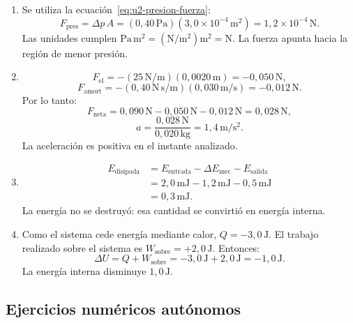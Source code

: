 \begin{enumerate}[label=\textbf{NG\arabic*.},leftmargin=*]
    \item Se utiliza la ecuación~\eqref{eq:u2-presion-fuerza}:
    \[
        F_\mathrm{pres}
        =\Delta p\,A
        =(0{,}40\,\text{Pa})(3{,}0\times10^{-4}\,\text{m}^{2})
        =1{,}2\times10^{-4}\,\text{N}.
    \]
    Las unidades cumplen
    \(\text{Pa}\,\text{m}^{2}
    =(\text{N}/\text{m}^{2})\text{m}^{2}
    =\text{N}\). La fuerza apunta hacia la región de menor presión.

    \item
    \[
        F_\mathrm{el}
        =-(25\,\text{N}/\text{m})(0{,}0020\,\text{m})
        =-0{,}050\,\text{N},
    \]
    \[
        F_\mathrm{amort}
        =-(0{,}40\,\text{N}\,\text{s}/\text{m})
        (0{,}030\,\text{m}/\text{s})
        =-0{,}012\,\text{N}.
    \]
    Por lo tanto:
    \[
        F_\mathrm{neta}
        =0{,}090\,\text{N}-0{,}050\,\text{N}-0{,}012\,\text{N}
        =0{,}028\,\text{N},
    \]
    \[
        a=\frac{0{,}028\,\text{N}}{0{,}020\,\text{kg}}
        =1{,}4\,\text{m}/\text{s}^{2}.
    \]
    La aceleración es positiva en el instante analizado.

    \item
    \[
        \begin{aligned}
            E_\mathrm{disipada}
            &=E_\mathrm{entrada}-\Delta E_\mathrm{mec}-E_\mathrm{salida}\\
            &=2{,}0\,\text{mJ}-1{,}2\,\text{mJ}-0{,}5\,\text{mJ}\\
            &=0{,}3\,\text{mJ}.
        \end{aligned}
    \]
    La energía no se destruyó: esa cantidad se convirtió en energía interna.

    \item Como el sistema cede energía mediante calor,
    \(Q=-3{,}0\,\text{J}\). El trabajo realizado sobre el sistema es
    \(W_\mathrm{sobre}=+2{,}0\,\text{J}\). Entonces:
    \[
        \Delta U
        =Q+W_\mathrm{sobre}
        =-3{,}0\,\text{J}+2{,}0\,\text{J}
        =-1{,}0\,\text{J}.
    \]
    La energía interna disminuye \(1{,}0\,\text{J}\).
\end{enumerate}

\subsection*{Ejercicios numéricos autónomos}


